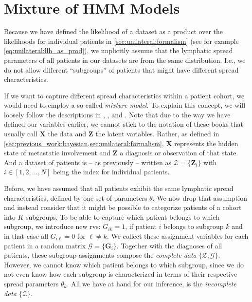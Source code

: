 \documentclass[\relativeRoot/main.tex]{subfiles}
\begin{document}
\section{Mixture of HMM Models}
\label{sec:future:mixture}

Because we have defined the likelihood of a dataset as a product over the likelihoods for individual patients in \cref{sec:unilateral:formalism} (see for example \cref{eq:unilateral:llh_as_prod}), we implicitly assume that the lymphatic spread parameters of all patients in our datasets are from the same distribution. I.e., we do not allow different ``subgroups'' of patients that might have different spread characteristics.

If we want to capture different spread characteristics within a patient cohort, we would need to employ a so-called \emph{mixture model}. To explain this concept, we will loosely follow the descriptions in , , and . Note that due to the way we have defined our variables earlier, we cannot stick to the notation of these books that usually call $\mathbf{X}$ the data and $\mathbf{Z}$ the latent variables. Rather, as defined in \cref{sec:previous_work:bayesian,sec:unilateral:formalism}, $\mathbf{X}$ represents the hidden state of metastatic involvement and $\mathbf{Z}$ a diagnosis or observation of that state. And a dataset of patients is -- as previously -- written as $\boldsymbol{\mathcal{Z}} = \{ \mathbf{Z}_i \}$ with $i \in [1, 2, \ldots, N]$ being the index for individual patients.

Before, we have assumed that all patients exhibit the same lymphatic spread characteristics, defined by one set of parameters $\theta$. We now drop that assumption and instead consider that it might be possible to categorize patients of a cohort into $K$ subgroups. To be able to capture which patient belongs to which subgroup, we introduce new \glspl{rv}: $G_{ik} = 1$, if patient $i$ belongs to subgroup $k$ and in that case all $G_{i\ell} = 0$ for $\ell \neq k$. We collect these assignment variables for each patient in a random matrix $\boldsymbol{\mathcal{G}} = \{ \mathbf{G}_i \}$. Together with the diagnoses of all patients, these subgroup assignments compose the \emph{complete data} $\{ \boldsymbol{\mathcal{Z}}, \boldsymbol{\mathcal{G}} \}$. However, we cannot know which patient belongs to which subgroup, since we do not even know how each subgroup is characterized in terms of their respective spread parameters $\theta_k$. All we have at hand for our inference, is the \emph{incomplete data} $\{ \boldsymbol{\mathcal{Z}} \}$.
\end{document}
